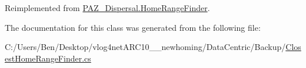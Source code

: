 Reimplemented from \hyperlink{class_p_a_z___dispersal_1_1_home_range_finder_a24dfc7d54c2bc67b175d7962b3de275b}{P\-A\-Z\-\_\-\-Dispersal.\-Home\-Range\-Finder}.



The documentation for this class was generated from the following file\-:\begin{DoxyCompactItemize}
\item 
C\-:/\-Users/\-Ben/\-Desktop/vlog4net\-A\-R\-C10\-\_\-\_\-newhoming/\-Data\-Centric/\-Backup/\hyperlink{_backup_2_closest_home_range_finder_8cs}{Closest\-Home\-Range\-Finder.\-cs}\end{DoxyCompactItemize}
